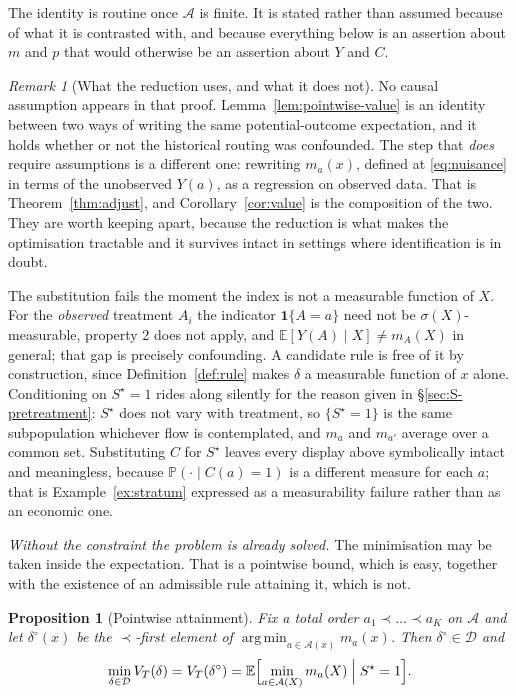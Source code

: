 \documentclass[11pt,a4paper]{article}
\theoremstyle{plain}
\newtheorem{proposition}[theorem]{Proposition}
\theoremstyle{definition}
\theoremstyle{remark}
\newtheorem*{remark*}{Remark}
\DeclareMathOperator*{\argmin}{arg\,min}
\newcommand{\E}{\mathbb E}
\newcommand{\Prob}{\mathbb P}
\newcommand{\one}[1]{\mathbf 1\{#1\}}
\newcommand{\Sstar}{S^{\star}}
\begin{document}
The identity is routine once $\mathcal A$ is finite. It is stated rather than assumed because of
what it is contrasted with, and because everything below is an assertion about $m$ and $p$ that
would otherwise be an assertion about $Y$ and $C$.

\begin{remark*}[What the reduction uses, and what it does not]
No causal assumption appears in that proof. Lemma~\ref{lem:pointwise-value} is an identity
between two ways of writing the same potential-outcome expectation, and it holds whether or not
the historical routing was confounded. The step that \emph{does} require assumptions is a
different one: rewriting $m_a(x)$, defined at \eqref{eq:nuisance} in terms of the unobserved
$Y(a)$, as a regression on observed data. That is Theorem~\ref{thm:adjust}, and
Corollary~\ref{cor:value} is the composition of the two. They are worth keeping apart, because
the reduction is what makes the optimisation tractable and it survives intact in settings where
identification is in doubt.

The substitution fails the moment the index is not a measurable function of $X$. For the
\emph{observed} treatment $A_i$ the indicator $\one{A=a}$ need not be $\sigma(X)$-measurable,
property 2 does not apply, and $\E[Y(A)\mid X]\ne m_A(X)$ in general; that gap is precisely
confounding. A candidate rule is free of it by construction, since Definition~\ref{def:rule}
makes $\delta$ a measurable function of $x$ alone. Conditioning on $\Sstar=1$ rides along
silently for the reason given in \S\ref{sec:S-pretreatment}: $\Sstar$ does not vary with
treatment, so $\{\Sstar=1\}$ is
the same subpopulation whichever flow is contemplated, and $m_a$ and $m_{a'}$ average over a
common set. Substituting $C$ for $\Sstar$ leaves every display above symbolically intact and
meaningless, because $\Prob(\cdot\mid C(a)=1)$ is a different measure for each $a$; that is
Example~\ref{ex:stratum} expressed as a measurability failure rather than as an economic one.
\end{remark*}

\emph{Without the constraint the problem is already solved.} The minimisation may be taken inside
the expectation. That is a pointwise bound, which is easy, together with the existence of an
admissible rule attaining it, which is not.

\begin{proposition}[Pointwise attainment]\label{prop:interchange}
Fix a total order $a_1\prec\dots\prec a_K$ on $\mathcal A$ and let $\delta^\circ(x)$ be the
$\prec$-first element of $\argmin_{a\in\mathcal A(x)}m_a(x)$. Then $\delta^\circ\in\mathcal D$ and
\[
\min_{\delta\in\mathcal D}V_T(\delta)
=V_T(\delta^\circ)
=\E\Bigl[\min_{a\in\mathcal A(X)}m_a(X)\Bigm|\Sstar=1\Bigr].
\]
\end{proposition}
\end{document}
